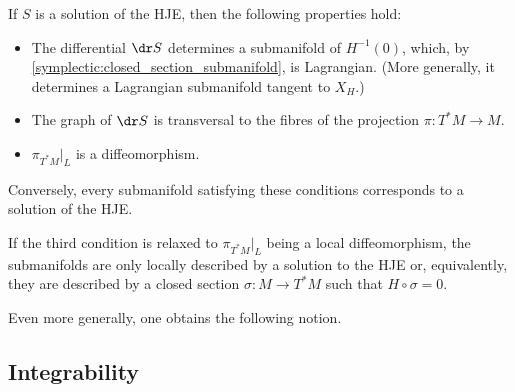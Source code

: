     \begin{property}
        If $S$ is a solution of the HJE, then the following properties hold:
        \begin{itemize}
            \item The differential $\dr S$ determines a submanifold of $H^{-1}(0)$, which, by \cref{symplectic:closed_section_submanifold}, is Lagrangian. (More generally, it determines a Lagrangian submanifold tangent to $X_H$.)
            \item The graph of $\dr S$ is transversal to the fibres of the projection $\pi:T^*M\rightarrow M$.
            \item $\pi_{T^*M}|_L$ is a diffeomorphism.
        \end{itemize}
        Conversely, every submanifold satisfying these conditions corresponds to a solution of the HJE.
    \end{property}
    \begin{remark}
        If the third condition is relaxed to $\pi_{T^*M}|_L$ being a local diffeomorphism, the submanifolds are only locally described by a solution to the HJE or, equivalently, they are described by a closed section $\sigma:M\rightarrow T^*M$ such that $H\circ \sigma=0$.
    \end{remark}

    Even more generally, one obtains the following notion.



\subsection{Integrability}\label{section:integrability}

